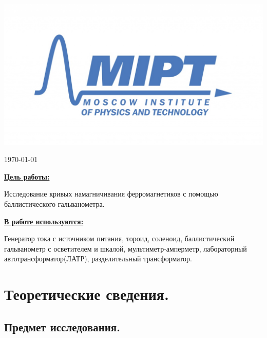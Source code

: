\documentclass[a4paper, 12pt, twoside]{article}
\newenvironment{bottompar}{\par\vspace*{\fill}}{\clearpage}
\begin{document}
\begin{titlepage}
\begin{bottompar}
	\begin{center}
		\includegraphics[width = 80 mm]{logo.jpg}
	\end{center}
	{\large \today}

\end{bottompar}
\vfill %

\end{titlepage}

{\Large \uline { \textbf  {Цель работы:}}}

\vspace{2mm}

Исследование кривых намагничивания ферромагнетиков с помощью баллистического гальванометра.

\vspace{\baselineskip}

{\Large \uline { \textbf  {В работе используются:}}}

\vspace{2mm}

Генератор тока с источником питания, тороид, соленоид, баллистический гальванометр с осветителем и шкалой, мультиметр-амперметр, лабораторный автотрансформатор(ЛАТР), разделительный трансформатор.

\section{Теоретические сведения.}
\subsection{Предмет исследования.}
\end{document}
